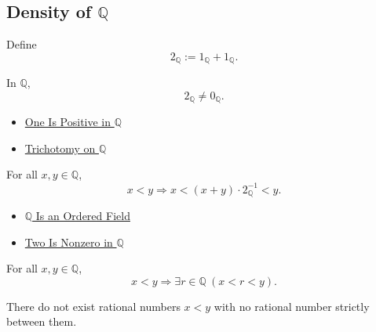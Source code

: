 \subsection*{Density of $\mathbb{Q}$}

\begin{definition}
\label{def:two-in-q}
Define
\[
2_{\mathbb{Q}}:=1_{\mathbb{Q}}+1_{\mathbb{Q}}.
\]
\end{definition}

\begin{lemma}
\label{lem:two-nonzero-in-q}
In $\mathbb{Q}$,
\[
2_{\mathbb{Q}}\ne 0_{\mathbb{Q}}.
\]
\end{lemma}

\begin{dependencies}
\begin{itemize}
  \item \hyperref[cor:one-positive-on-q]{One Is Positive in $\mathbb{Q}$}
  \item \hyperref[thm:trichotomy-on-q]{Trichotomy on $\mathbb{Q}$}
\end{itemize}
\end{dependencies}

\begin{lemma}
\label{lem:midpoint-between-q}
For all $x,y\in\mathbb{Q}$,
\[
x<y
\Longrightarrow
x< (x+y)\cdot 2_{\mathbb{Q}}^{-1}<y.
\]
\end{lemma}

\begin{dependencies}
\begin{itemize}
  \item \hyperref[thm:q-is-an-ordered-field]{$\mathbb{Q}$ Is an Ordered Field}
  \item \hyperref[lem:two-nonzero-in-q]{Two Is Nonzero in $\mathbb{Q}$}
\end{itemize}
\end{dependencies}

\begin{theorem}
\label{thm:density-of-q}
For all $x,y\in\mathbb{Q}$,
\[
x<y
\Longrightarrow
\exists r\in\mathbb{Q}\ (x<r<y).
\]
\end{theorem}

\begin{corollary}
\label{cor:q-has-no-adjacent-points}
There do not exist rational numbers $x<y$ with no rational number strictly
between them.
\end{corollary}

